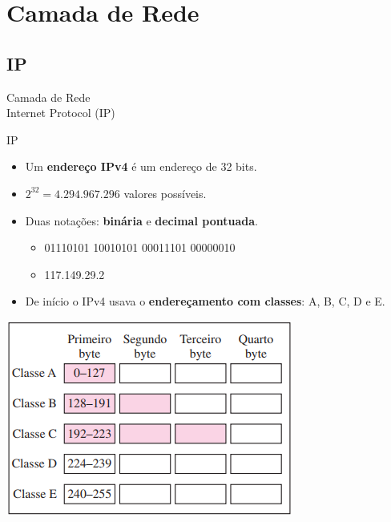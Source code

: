 \documentclass{libs/ufc_format}
\begin{document}
\section{Camada de Rede}

\subsection{IP}

\begin{frame}{}
    \centering
    \Large
    Camada de Rede\\
    \large
    Internet Protocol (IP)
\end{frame}

\begin{frame}{IP}
    \begin{itemize}
        \justifying
        \item Um \textbf{endereço IPv4} é um endereço de 32 bits.
        \item $2^{32} = 4.294.967.296$ valores possíveis.
        \item Duas notações: \textbf{binária} e \textbf{decimal pontuada}.
            \begin{itemize}
                \item 01110101 10010101 00011101 00000010
                \item 117.149.29.2
            \end{itemize}
        \item De início o IPv4 usava o \textbf{endereçamento com classes}: A, B, C, D e E.
    \end{itemize}
    \centering
    \includegraphics[scale=0.7]{figuras/figura06_04}
\end{frame}
\end{document}
